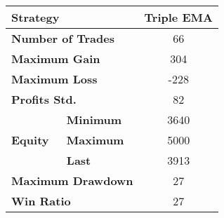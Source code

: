 \centering
\begin{tabular}{ll|c}
    \toprule
    \multicolumn{2}{l|}{Strategy} & Triple EMA \\
    \midrule
    \multicolumn{2}{l|}{\textbf{Number of Trades}} & 66 \\
    \multicolumn{2}{l|}{\textbf{Maximum Gain}} & 304 \\
    \multicolumn{2}{l|}{\textbf{Maximum Loss}} & -228 \\
    \multicolumn{2}{l|}{\textbf{Profits Std.}} & 82 \\
    \multirow{3}{*}{\textbf{Equity}} & \textbf{Minimum} & 3640 \\
    & \textbf{Maximum} & 5000 \\
    & \textbf{Last}    & 3913 \\
    \multicolumn{2}{l|}{\textbf{Maximum Drawdown}} & 27 \\
    \multicolumn{2}{l|}{\textbf{Win Ratio}} & 27 \\
    \bottomrule
\end{tabular}
